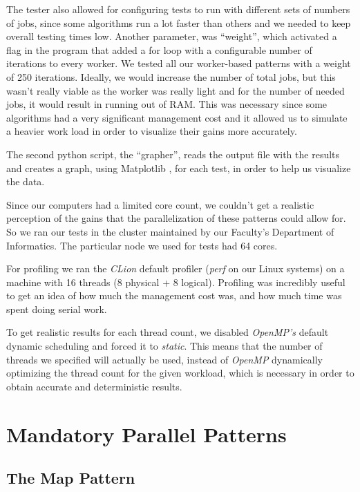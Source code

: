 \documentclass[10pt,journal]{IEEEtran}
\begin{document}
The tester also allowed for configuring tests to run with different sets of numbers of jobs, since some algorithms run a lot faster than others and we needed to keep overall testing times low.  Another parameter, was “weight”, which activated a flag in the program that added a for loop with a configurable number of iterations to every worker. We tested all our worker-based patterns with a weight of 250 iterations. Ideally, we would increase the number of total jobs, but this wasn't really viable as the worker was really light and for the number of needed jobs, it would result in running out of RAM. This was necessary since some algorithms had a very significant management cost and it allowed us to simulate a heavier work load in order to visualize their gains more accurately. 

The second python script, the “grapher”, reads the output file with the results and creates a graph, using Matplotlib \cite{matplotlib}, for each test, in order to help us visualize the data. 

Since our computers had a limited core count, we couldn’t get a realistic perception of the gains that the parallelization of these patterns could allow for. So we ran our tests in the cluster maintained by our Faculty’s Department of Informatics. The particular node we used for tests had 64 cores. 

For profiling we ran the \textit{CLion} default profiler (\textit{perf} on our Linux systems) on a machine with 16 threads (8 physical + 8 logical). Profiling was incredibly useful to get an idea of how much the management cost was, and how much time was spent doing serial work.

To get realistic results for each thread count, we disabled \textit{OpenMP's} default dynamic scheduling and forced it to \textit{static}. This means that the number of threads we specified will actually be used, instead of \textit{OpenMP} dynamically optimizing the thread count for the given workload, which is necessary in order to obtain accurate and deterministic results.

\section{Mandatory Parallel Patterns}

\subsection{The Map Pattern}
\label{map}
\end{document}
